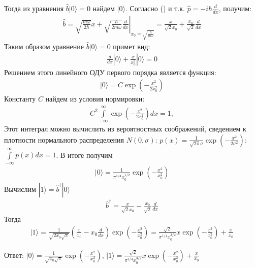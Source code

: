 \documentclass[__main__.tex]{subfiles}
\begin{document}
Тогда из уравнения $\hat{b}|0\rangle = 0$ найдем $|0\rangle$. Согласно () и т.к. $\hat{p}=-i\hbar\frac{d}{dx}$, получим:
\begin{gather*}
\hat{b}
=
\left.
\sqrt{\frac{m\omega}{2\hbar}}x+\sqrt{\frac{\hbar}{2m\omega}}\frac{d}{dx}
\right|_{x_0=\sqrt{\frac{\hbar}{m\omega}}}
=
\frac{x}{\sqrt{2}x_0}+\frac{x_0}{\sqrt{2}}\frac{d}{dx}
\end{gather*}
Таким образом уравнение $\hat{b}|0\rangle = 0$ примет вид:
\begin{gather*}
\frac{d}{dx}|0\rangle + \frac{x}{x_0^2}|0\rangle = 0
\end{gather*}
Решением этого линейного ОДУ первого порядка является функция:
\begin{gather*}
|0\rangle = C\exp\left(-\frac{x^2}{2x_0^2}\right)
\end{gather*}
Константу $C$ найдем из условия нормировки:
\begin{gather*}
C^2\int\limits_{-\infty}^{\infty}\exp\left(-\frac{x^2}{2x_0^2}\right)dx=1,
\end{gather*}
Этот интеграл можно вычислить из вероятностных соображений, сведением к плотности нормального распределения $N(0,\sigma)$: $p(x)=\frac{1}{\sqrt{2\pi}\sigma}\exp\left(-\frac{x^2}{2\sigma^2}\right)$: $\int\limits_{-\infty}^{\infty}p(x)dx=1$.
В итоге получим
\begin{gather*}
|0\rangle = \frac{1}{\pi^{1/4}x_0^{1/2}}\exp\left(-\frac{x^2}{x_0^2}\right)
\end{gather*}
Вычислим $|1\rangle = \hat{b}^\dagger|0\rangle$
\begin{gather*}
\hat{b}^\dagger
=
\frac{x}{\sqrt{2}x_0}-\frac{x_0}{\sqrt{2}}\frac{d}{dx}
\end{gather*}
Тогда
\begin{gather*}
|1\rangle
=
\frac{1}{\sqrt{2x_0\sqrt{\pi}}}\left(\frac{x}{x_0}-x_0\frac{d}{dx}\right)\exp\left(-\frac{x^2}{x_0^2}\right)
=
\frac{\sqrt{2}}{\pi^{1/4}x_0^{3/2}}x\exp\left(-\frac{x^2}{x_0^2}\right) + \frac{x}{x_0}
\end{gather*}

Ответ: $|0\rangle = \frac{1}{\sqrt{x_0\sqrt{\pi}}}\exp\left(-\frac{x^2}{x_0^2}\right)$, 
$|1\rangle = \frac{\sqrt{2}}{\pi^{1/4}x_0^{3/2}}x\exp\left(-\frac{x^2}{x_0^2}\right) + \frac{x}{x_0}$
\end{document}
